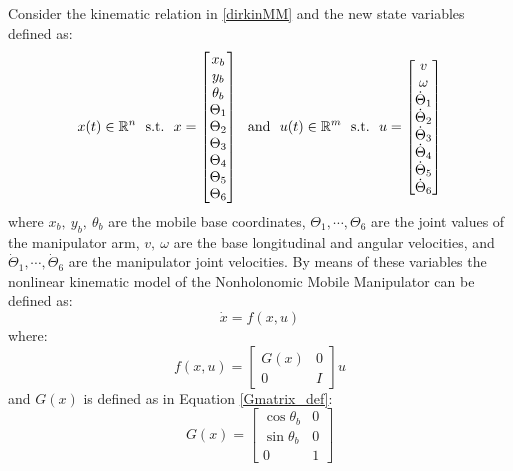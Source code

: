 Consider the kinematic relation in \ref{dirkinMM} and the new state variables defined as:
\begin{equation} \label{state_control_def}
{x}(t) \in \mathbb{R}^n\ \  \textnormal{s.t.}\ \  {x}  = \left[ \begin{matrix} x_b \\ y_b \\ \theta_b \\ \Theta_1 \\ \Theta_2 \\ \Theta_3 \\ \Theta_4 \\ \Theta_5 \\ \Theta_6 \end{matrix} \right]\ \   \textnormal{and}\ \  {u}(t) \in \mathbb{R}^m\ \ \textnormal{s.t.}\ \ {u}=\left[ \begin{matrix} v \\ \omega \\ \dot{\Theta}_1 \\ \dot{\Theta}_2 \\ \dot{\Theta}_3 \\ \dot{\Theta}_4 \\ \dot{\Theta}_5 \\ \dot{\Theta}_6 \end{matrix} \right]
\end{equation}
where $x_b,\ y_b,\ \theta_b$ are the mobile base coordinates, $\Theta_1, \cdots ,\Theta_6$ are the joint values of the manipulator arm, $v, \ \omega$ are the base longitudinal and angular velocities, and $\dot{\Theta}_1, \cdots ,\dot{\Theta}_6$ are the manipulator joint velocities.
By means of these variables the nonlinear kinematic model of the Nonholonomic Mobile Manipulator can be defined as:
\begin{equation} \label{system_base}
	\dot{{x}}=f({x},{u})
\end{equation} 
where:
\begin{equation} \label{NLsystem}
	f({x},{u}) = \left[ \begin{matrix}
	G({x}) & 0 \\ 0 & I \end{matrix} \right]u
\end{equation}
and $G(x)$ is defined as in Equation \ref{Gmatrix_def}:
\begin{equation*}
G({x}) =  \left[
\begin{matrix}
\cos\theta_b & 0 \\
\sin\theta_b & 0 \\
0 & 1 
\end{matrix}
\right] 
\end{equation*}

